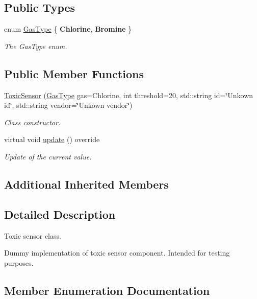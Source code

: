 \subsection*{Public Types}
\begin{DoxyCompactItemize}
\item 
enum \hyperlink{classToxicSensor_a140f14965ad9a7e71fc8a5a2ed2c919b}{Gas\+Type} \{ {\bfseries Chlorine}, 
{\bfseries Bromine}
 \}\begin{DoxyCompactList}\small\item\em The Gas\+Type enum. \end{DoxyCompactList}
\end{DoxyCompactItemize}
\subsection*{Public Member Functions}
\begin{DoxyCompactItemize}
\item 
\hyperlink{classToxicSensor_a3d1f5f90e0561127e8ee3e5ee79c6473}{Toxic\+Sensor} (\hyperlink{classToxicSensor_a140f14965ad9a7e71fc8a5a2ed2c919b}{Gas\+Type} gas=Chlorine, int threshold=20, std\+::string id=\char`\"{}Unkown id\char`\"{}, std\+::string vendor=\char`\"{}Unkown vendor\char`\"{})
\begin{DoxyCompactList}\small\item\em Class constructor. \end{DoxyCompactList}\item 
virtual void \hyperlink{classToxicSensor_ae4c58761cf2ef02e1d782f7f13cc56ff}{update} () override
\begin{DoxyCompactList}\small\item\em Update of the current value. \end{DoxyCompactList}\end{DoxyCompactItemize}
\subsection*{Additional Inherited Members}


\subsection{Detailed Description}
Toxic sensor class. 

Dummy implementation of toxic sensor component. Intended for testing purposes. 

\subsection{Member Enumeration Documentation}
